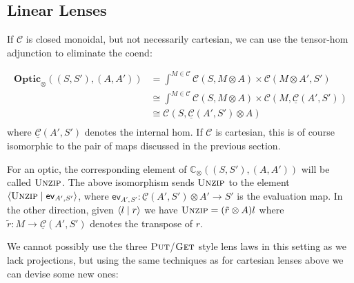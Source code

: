 \documentclass[11pt,a4paper]{article}
\theoremstyle{plain}
\theoremstyle{definition}
\newcommand{\C}{\mathscr{C}}
\newcommand{\homC}{\underline{\C}}
\newcommand{\Optic}{\mathbf{Optic}}
\newcommand{\conc}{\mathbb{C}}
\newcommand{\rep}[2]{{\ensuremath \left\langle #1 \mid #2 \right\rangle}}
\newcommand{\fget}{\textsc{Get}}
\newcommand{\fput}{\textsc{Put}}
\newcommand{\funzip}{\textsc{Unzip}}
\begin{document}
\subsection{Linear Lenses}
\newcommand{\ev}{\mathsf{ev}}
\newcommand{\coev}{\mathsf{coev}}

If $\C$ is closed monoidal, but not necessarily cartesian, we can use the tensor-hom adjunction to eliminate the coend:

\begin{align*}
  \Optic_\otimes((S, S'), (A, A')) &= \int^{M \in \C} \C(S, M \otimes A) \times \C(M \otimes A', S') \\
                                   &\cong \int^{M \in \C} \C(S, M \otimes A) \times \C(M, \homC(A',S')) \\
                                   &\cong \C(S, \homC(A',S') \otimes A) \\
\end{align*}
where $\homC(A', S')$ denotes the internal hom. If $\C$ is cartesian, this is of course isomorphic to the pair of maps discussed in the previous section.

For an optic, the corresponding element of $\conc_\otimes((S, S'), (A, A'))$ will be called $\funzip$. The above isomorphism sends $\funzip$ to the element $\rep{\funzip }{\ev_{A', S'}}$, where $\ev_{A', S'} : \homC(A',S') \otimes A' \to S'$ is the evaluation map. In the other direction, given $\rep{l}{r }$ we have $\funzip = (\tilde r \otimes A)l$ where $\tilde r : M \to \homC(A', S')$ denotes the transpose of $r$.

We cannot possibly use the three $\fput$/$\fget$ style lens laws in this setting as we lack projections, but using the same techniques as for cartesian lenses above we can devise some new ones:
\end{document}
